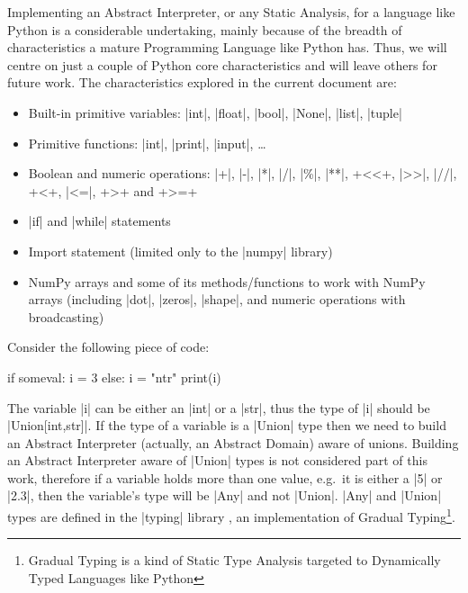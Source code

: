 Implementing an Abstract Interpreter, or any Static Analysis, for a language like Python
is a considerable undertaking, mainly because of the breadth of characteristics a mature
Programming Language like Python has. Thus, we will centre on just a couple of Python core
characteristics and will leave others for future work. The characteristics explored in the
current document are:

\begin{itemize}
\tightlist
\item
  Built-in primitive variables: \pycode|int|, \pycode|float|, \pycode|bool|, \pycode|None|,
  \pycode|list|, \pycode|tuple|
\item
  Primitive functions: \pycode|int|, \pycode|print|, \pycode|input|,
  \ldots{}
\item
  Boolean and numeric operations: \pycode|+|, \pycode|-|, \pycode|*|, \pycode|/|,
  \pycode|\%|, \pycode|**|, \pycode+<<+, \pycode|>>|, \pycode|//|, \pycode+<+,
  \pycode|<=|, \pycode+>+ and \pycode+>=+
\item
  \pycode|if| and \pycode|while| statements
\item
  Import statement (limited only to the \pycode|numpy| library)
\item
  NumPy arrays and some of its methods/functions to work with NumPy arrays (including
  \pycode|dot|, \pycode|zeros|, \pycode|shape|, and numeric operations with broadcasting)
\end{itemize}

Consider the following piece of code:

\begin{pythoncode}
if someval:
  i = 3
else:
  i = "ntr"
print(i)
\end{pythoncode}

The variable \pycode|i| can be either an \pycode|int| or a \pycode|str|,
thus the type of \pycode|i| should be \pycode|Union[int,str]|. If
the type of a variable is a \pycode|Union| type then we need to build
an Abstract Interpreter (actually, an Abstract Domain) aware of unions.
Building an Abstract Interpreter aware of \pycode|Union| types is not
considered part of this work, therefore if a variable holds more than
one value, e.g.~it is either a \pycode|5| or \pycode|2.3|, then the
variable's type will be \pycode|Any| and not \pycode|Union|.
\pycode|Any| and \pycode|Union| types are defined in the \pycode|typing|
library \autocite{pep484}, an implementation of Gradual Typing\footnote{Gradual
  Typing is a kind of Static Type Analysis targeted to Dynamically Typed
  Languages like Python}.

